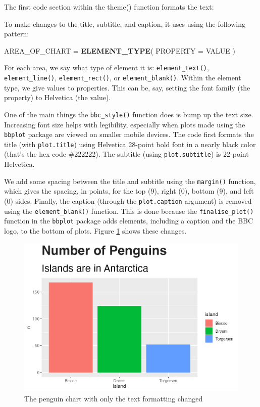 \documentclass[
]{book}
\newenvironment{Shaded}{\begin{snugshade}}{\end{snugshade}}
\newcommand{\AttributeTok}[1]{\textcolor[rgb]{0.13,0.29,0.53}{#1}}
\newcommand{\FunctionTok}[1]{\textcolor[rgb]{0.13,0.29,0.53}{\textbf{#1}}}
\newcommand{\NormalTok}[1]{#1}
\newcommand{\OtherTok}[1]{\textcolor[rgb]{0.56,0.35,0.01}{#1}}
\begin{document}
The first code section within the theme() function formats the text:

To make changes to the title, subtitle, and caption, it uses using the following pattern:

\begin{Shaded}
\begin{Highlighting}[]
\NormalTok{AREA\_OF\_CHART }\OtherTok{=} \FunctionTok{ELEMENT\_TYPE}\NormalTok{(}
  \AttributeTok{PROPERTY =}\NormalTok{ VALUE}
\NormalTok{)}
\end{Highlighting}
\end{Shaded}

For each area, we say what type of element it is: \texttt{element\_text()}, \texttt{element\_line()}, \texttt{element\_rect()}, or \texttt{element\_blank()}. Within the element type, we give values to properties. This can be, say, setting the font family (the property) to Helvetica (the value).

One of the main things the \texttt{bbc\_style()} function does is bump up the text size. Increasing font size helps with legibility, especially when plots made using the \texttt{bbplot} package are viewed on smaller mobile devices. The code first formats the title (with \texttt{plot.title}) using Helvetica 28-point bold font in a nearly black color (that's the hex code \#222222). The subtitle (using \texttt{plot.subtitle}) is 22-point Helvetica.

We add some spacing between the title and subtitle using the \texttt{margin()} function, which gives the spacing, in points, for the top (9), right (0), bottom (9), and left (0) sides. Finally, the caption (through the \texttt{plot.caption} argument) is removed using the \texttt{element\_blank()} function. This is done because the \texttt{finalise\_plot()} function in the \texttt{bbplot} package adds elements, including a caption and the BBC logo, to the bottom of plots. Figure \ref{fig:penguins-plot-text-formatting-plot} shows these changes.

\begin{figure}
\includegraphics[width=1\linewidth]{custom-theme_files/figure-latex/penguins-plot-text-formatting-plot-1} \caption{The penguin chart with only the text formatting changed}\label{fig:penguins-plot-text-formatting-plot}
\end{figure}
\end{document}
